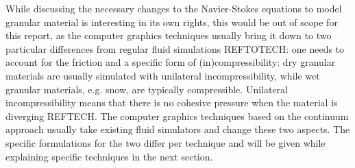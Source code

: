 While discussing the necessary changes to the Navier-Stokes equations to model granular material is interesting in its own rights, this would be out of scope for this report, as the computer graphics techniques usually bring it down to two particular differences from regular fluid simulations REFTOTECH: one needs to account for the friction and a specific form of (in)compressibility: dry granular materials are usually simulated with unilateral incompressibility, while wet granular materials, e.g. snow, are typically compressible. Unilateral incompressibility means that there is no cohesive pressure when the material is diverging REFTECH. The computer graphics techniques based on the continuum approach usually take existing fluid simulators and change these two aspects. The specific formulations for the two differ per technique and will be given while explaining specific techniques in the next section.\\

\ifx\isEmbedded\undefined


\pagebreak

\fi
